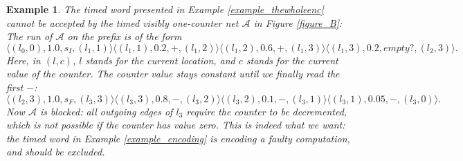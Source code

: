 \documentclass{CSML}
\theoremstyle{plain}\newtheorem{theorem}[thm]{Theorem}
\theoremstyle{plain}\newtheorem{corollary}[thm]{Corollary}
\theoremstyle{plain}\newtheorem{example}[thm]{Example}
\theoremstyle{plain}\newtheorem{lemma}[thm]{Lemma}
\theoremstyle{plain}\newtheorem{remark}[thm]{Remark}
\newcommand{\loc}{\mathit{l}}
\newcommand{\A}{\mathcal{A}}
\begin{document}
\begin{example}
	The timed word presented in Example \ref{example_thewholeenc} cannot be accepted by the timed visibly one-counter net $\A$ in Figure \ref{figure_B}: 
	The run of $\A$ on the prefix is of the form 
	$$\langle(\loc_0,0),1.0,s_I,(\loc_1,1)\rangle\langle(\loc_1,1),0.2,+,(\loc_1,2)\rangle\langle(\loc_1,2),0.6,+,(\loc_1,3)\rangle\langle(\loc_1,3),0.2,empty?,(\loc_2,3)\rangle.$$
	Here, in $(\loc,c)$, $\loc$ stands for the current location, and $c$ stands for the current value of the counter. 
	The counter value stays constant until we finally read the first $-$:  
	$$\langle(\loc_2,3),1.0,s_F,(\loc_3,3)\rangle\langle(\loc_3,3),0.8,-,(\loc_3,2)\rangle\langle(\loc_3,2),0.1,-,(\loc_3,1)\rangle\langle(\loc_3,1),0.05,-,(\loc_3,0)\rangle.$$
	Now $\A$ is blocked:
	all outgoing edges of $\loc_3$ require the counter to be decremented, which is not possible if the counter has value zero. 
	This is indeed what we want: the timed word in Example \ref{example_encoding} is encoding a faulty computation, and should be excluded.  
\end{example}
\end{document}
